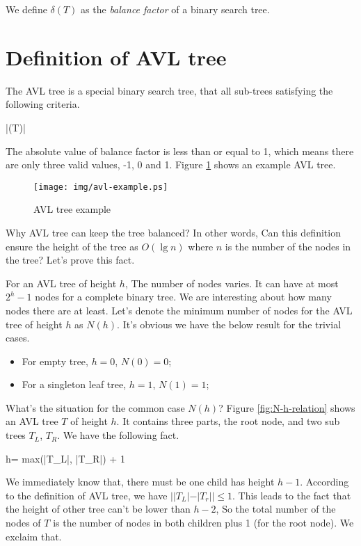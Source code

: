 \documentclass{article}
\begin{document}
We define $\delta(T)$ as the {\em balance factor} of a binary search
tree.

\section{Definition of AVL tree}

The AVL tree is a special binary search tree, that all sub-trees
satisfying the following criteria.

\be
  |\delta(T)| 
\ee

The absolute value of balance factor is less than or equal to 1, which
means there are only three valid values, -1, 0 and 1. Figure \ref{fig:avl-example} shows an example AVL tree.

\begin{figure}[htbp]
   \centering
   \texttt{[image: img/avl-example.ps]}
   \caption{AVL tree example} \label{fig:avl-example}
\end{figure}


Why AVL tree can keep the tree balanced? In other words, Can this definition
ensure the height of the tree as $O(\lg n)$ where $n$ is the number of
the nodes in the tree? Let's prove this fact.

For an AVL tree of height $h$, The number of nodes varies. It can have at
most $2^h-1$ nodes for a complete binary tree. We are interesting about
how many nodes there are at least. Let's denote the minimum number of nodes
for the AVL tree of height $h$ as $N(h)$. It's obvious we have the below
result for the trivial cases.

\begin{itemize}
\item For empty tree, $h=0$, $N(0)=0$;
\item For a singleton leaf tree, $h=1$, $N(1)=1$;
\end{itemize}

What's the situation for the common case $N(h)$? Figure \ref{fig:N-h-relation}
shows an AVL tree $T$ of height $h$. It contains three parts, the root node,
and two sub trees $T_L$, $T_R$. We have the following fact.

\be
  h= max(|T_L|, |T_R|) + 1
\ee

We immediately know that, there must be one child has height $h-1$. According
to the definition of AVL tree, we have
$||T_L|-|T_r|| \leq 1$. This leads to the fact that the height of
other tree can't be lower than $h-2$, So the total number of the nodes
of $T$ is the number of nodes in both children plus 1 (for the root node).
We exclaim that.
\end{document}

